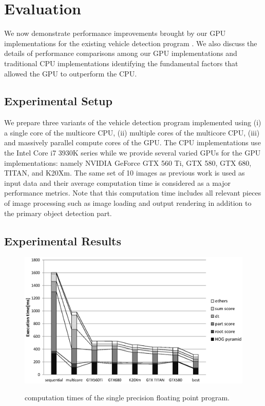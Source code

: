 \section{Evaluation}
\label{sec:evaluation}

We now demonstrate performance improvements brought by our GPU
implementations for the existing vehicle detection program
\cite{Niknejad12}.
We also discuss the details of performance comparisons among our GPU
implementations and traditional CPU implementations identifying the
fundamental factors that allowed the GPU to outperform the CPU.

\subsection{Experimental Setup}
\label{sec:setup}

We prepare three variants of the vehicle detection program implemented
using (i) a single core of the multicore CPU, (ii) multiple cores of the
multicore CPU, (iii) and massively parallel compute cores of the GPU.
The CPU implementations use the Intel Core i7 3930K series while we
provide several varied GPUs for the GPU implementations: namely NVIDIA
GeForce GTX 560 Ti, GTX 580, GTX 680, TITAN, and K20Xm.
The same set of 10 images as previous work \cite{Niknejad12} is used as
input data and their average computation time is considered as a major
performance metrics.
Note that this computation time includes all relevant pieces of image
processing such as image loading and output rendering in addition to the
primary object detection part.

\subsection{Experimental Results}
\label{sec:results}

\begin{figure}[t]
 \begin{center}
  \includegraphics[width=\hsize]{fig/float_exe_time.eps}\\
  \caption{computation times of the single precision floating point program.}
  \label{fig:float_exe_time}
 \end{center}
\end{figure}

